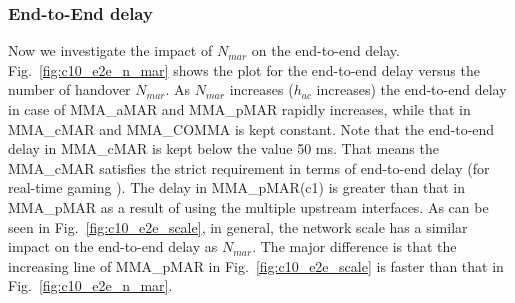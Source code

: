 \subsubsection{End-to-End delay}
Now we investigate the impact of $N_{mar}$ on the end-to-end delay. Fig.~\ref{fig:c10_e2e_n_mar} shows the plot for the end-to-end delay versus the number of handover $N_{mar}$. As $N_{mar}$ increases ($h_{ac}$ increases) the end-to-end delay in case of MMA\_aMAR and MMA\_pMAR rapidly increases, while that in MMA\_cMAR and MMA\_COMMA is kept constant. Note that the end-to-end delay in MMA\_cMAR is kept below the value 50 ms. That means the MMA\_cMAR satisfies the strict requirement in terms of end-to-end delay (for real-time gaming \cite{e2e_requirement}). The delay in MMA\_pMAR(c1) is greater than that in MMA\_pMAR as a result of using the multiple upstream interfaces. As can be seen in Fig.~\ref{fig:c10_e2e_scale}, in general, the network scale has a similar impact on the end-to-end delay as $N_{mar}$. The major difference is that the increasing line of MMA\_pMAR in Fig.~\ref{fig:c10_e2e_scale} is faster than that in Fig.~\ref{fig:c10_e2e_n_mar}.

